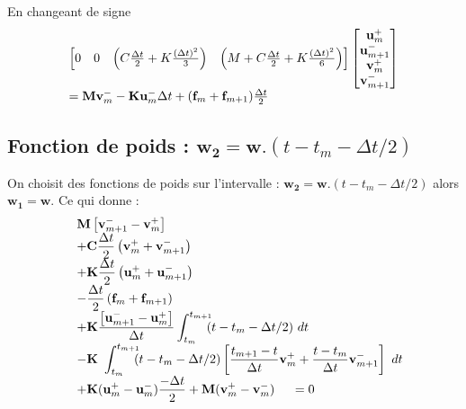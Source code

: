 \documentclass[12pt,a4paper]{report}
\begin{document}
En changeant de signe
\begin{equation}
\begin{array}{l l}
		\begin{bmatrix}	   
		   0
		   &0
		   & \left(   C \frac{\Delta t}{2}
		    		+ K \frac{(\Delta t)^2}{3}
		     \right)
		   & \left(	  M
		    		+ C \frac{\Delta t}{2}
		    		+ K \frac{(\Delta t)^2}{6} 
		     \right)\\ 
		\end{bmatrix}
		\begin{bmatrix}
		   \mathbf{u}_m^+  		\\
		   \mathbf{u}_{m+1}^-  	\\
		   \mathbf{v}_m^+  		\\
		   \mathbf{v}_{m+1}^-  	\\
		\end{bmatrix}
	\\
		=   \mathbf{M} \mathbf{v}_m^-
		  - \mathbf{K} \mathbf{u}_m^- \Delta t
		  + (\mathbf{f}_m + \mathbf{f}_{m+1})  \frac{\Delta t}{2}
	
\end{array}
\end{equation}


\subsection{Fonction de poids : $\mathbf{w_2} = \mathbf{w}.(t-t_m-\Delta t/2)$}

On choisit des fonctions de poids sur l'intervalle : $\mathbf{w_2} = \mathbf{w}.(t-t_m-\Delta t/2)$ alors $\mathbf{w_1} = \mathbf{w}$.
Ce qui donne :
\begin{equation}
\begin{array}{r l}
	&\displaystyle
	 \mathbf{M} 
	    	\left[ \mathbf{v}_{m+1}^- 
	    		- \mathbf{v}_m^+ \right] 
	\\ 
	  &\displaystyle
	  +\mathbf{C} \frac{\Delta t}{2}
		\left(
			\mathbf{v}_m^+ + 
			\mathbf{v}_{m+1}^- 
		\right) 
	\\
	  &\displaystyle
	 +\mathbf{K} \frac{\Delta t}{2}
		\left(
			\mathbf{u}_m^+ + 
			\mathbf{u}_{m+1}^- 
		\right) 
	\\
	  &\displaystyle
	   -\frac{\Delta t}{2}
		\left(
			\mathbf{f}_m + 
			\mathbf{f}_{m+1}
		\right) 
	\\
	  &+\displaystyle
	    \mathbf{K}
	    	\frac{\left[ \mathbf{u}_{m+1}^- 
	    		- \mathbf{u}_m^+ \right]    }{\Delta t}			
			\int_{t_m}^{t_{m+1}} \!\!\! (t-t_m-\Delta t/2) ~dt
	\\
	  &\displaystyle	    
	    -\mathbf{K}~\int_{t_m}^{t_{m+1}} \!\!\! 	
		(t-t_m-\Delta t/2) \left[
			\frac{t_{m+1}-t}{\Delta t} \mathbf{v}_m^+ + 
			\frac{t-t_m}{\Delta t} \mathbf{v}_{m+1}^- 
			\right] ~dt
	\\
	  &\displaystyle
	   + \mathbf{K} (\mathbf{u}_m^+ - \mathbf{u}_m^-) \frac{-\Delta t}{2}
	   + \mathbf{M} (\mathbf{v}_m^+ - \mathbf{v}_m^-) 
	~~~~=0	
\end{array}
\end{equation}
\end{document}

